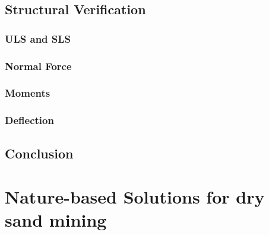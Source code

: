 \subsection{Structural Verification}

\subsubsection{ULS and SLS}

\subsubsection{Normal Force}

\subsubsection{Moments}

\subsubsection{Deflection}

\subsection{Conclusion}

\section{Nature-based Solutions for dry sand mining}